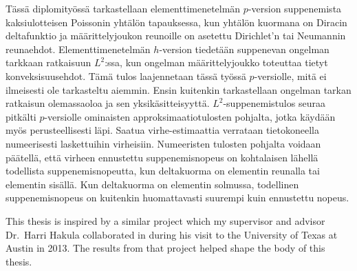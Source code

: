 \documentclass[english, 12pt, a4paper, sci, utf8, a-2b, online]{aaltothesis}
\theoremstyle{definition}
\theoremstyle{plain}
\numberwithin{equation}{section}
\begin{document}
\newpage
\date{29.4.2024}
\begin{abstractpage}[finnish]
Tässä diplomityössä tarkastellaan elementtimenetelmän $p$-version suppenemista
kaksiulotteisen Poissonin yhtälön tapauksessa, kun yhtälön kuormana on Diracin deltafunktio
ja määrittelyjoukon reunoille on asetettu Dirichlet'n tai Neumannin reunaehdot.
Elementtimenetelmän $h$-version tiedetään suppenevan ongelman tarkkaan ratkaisuun $L^2$:ssa,
kun ongelman määrittelyjoukko toteuttaa tietyt konveksisuusehdot.
Tämä tulos laajennetaan tässä työssä $p$-versiolle, mitä ei ilmeisesti ole tarkasteltu aiemmin.
Ensin kuitenkin tarkastellaan ongelman tarkan ratkaisun olemassaoloa ja sen yksikäsitteisyyttä.
$L^2$-suppenemistulos seuraa pitkälti $p$-versiolle ominaisten approksimaatiotulosten
pohjalta, jotka käydään myös perusteellisesti läpi. Saatua virhe-estimaattia
verrataan tietokoneella numeerisesti laskettuihin virheisiin.
Numeeristen tulosten pohjalta voidaan päätellä,
että virheen ennustettu suppenemisnopeus on kohtalaisen lähellä todellista suppenemisnopeutta,
kun deltakuorma on elementin reunalla tai elementin sisällä.
Kun deltakuorma on elementin solmussa, todellinen suppenemisnopeus on kuitenkin huomattavasti
suurempi kuin ennustettu nopeus.
\end{abstractpage}

\dothesispagenumbering{}

This thesis is inspired by a similar project which my supervisor and advisor
Dr.~Harri Hakula collaborated in during his visit to the University of Texas at Austin in 2013.
The results from that project helped shape the body of this thesis.
\end{document}
